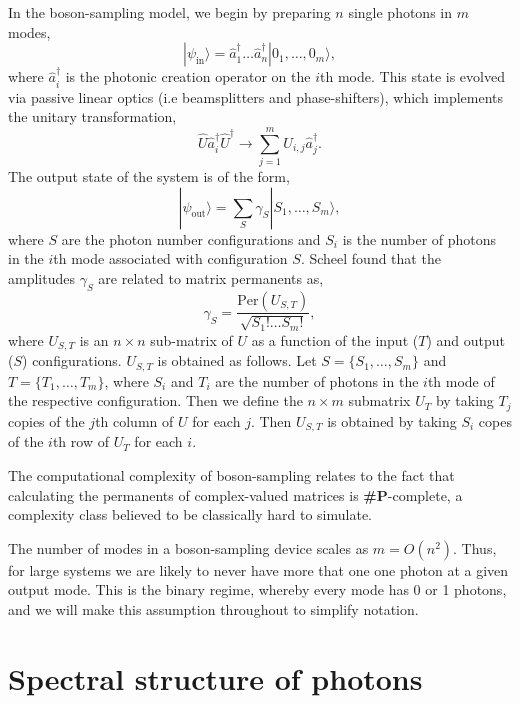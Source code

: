 \documentclass[aps,pra,twocolumn,amsmath,amssymb,nofootinbib,superscriptaddress]{revtex4}
\newcommand{\ket}[1]{|#1\rangle}
\begin{document}
In the boson-sampling model, we begin by preparing $n$ single photons in $m$ modes,
\begin{equation}
\ket{\psi_\mathrm{in}} = \hat{a}^\dag_1 \dots \hat{a}^\dag_n \ket{0_1,\dots,0_m},
\end{equation}
where \mbox{$\hat{a}^\dag_i$} is the photonic creation operator on the $i$th mode. This state is evolved via passive linear optics (i.e beamsplitters and phase-shifters), which implements the unitary transformation,
\begin{equation}
\hat{U}\hat{a}_i^\dag\hat{U}^\dag \to \sum_{j=1}^m U_{i,j} \hat{a}_j^\dag.
\end{equation}
The output state of the system is of the form,
\begin{equation}
\ket{\psi_\mathrm{out}} = \sum_S \gamma_S \ket{S_1,\dots,S_m},
\end{equation}
where $S$ are the photon number configurations and $S_i$ is the number of photons in the $i$th mode associated with configuration $S$. Scheel \cite{bib:Scheel04} found that the amplitudes $\gamma_S$ are related to matrix permanents as,
\begin{equation}
\gamma_S = \frac{\mathrm{Per}(U_{S,T})}{\sqrt{S_1!\dots S_m!}},
\end{equation}
where $U_{S,T}$ is an \mbox{$n\times n$} sub-matrix of $U$ as a function of the input ($T$) and output ($S$) configurations. $U_{S,T}$ is obtained as follows. Let \mbox{$S=\{S_1,\dots,S_m\}$} and \mbox{$T=\{T_1,\dots,T_m\}$}, where $S_i$ and $T_i$ are the number of photons in the $i$th mode of the respective configuration. Then we define the \mbox{$n\times m$} submatrix $U_T$ by taking $T_j$ copies of the $j$th column of $U$ for each $j$. Then $U_{S,T}$ is obtained by taking $S_i$ copes of the $i$th row of $U_T$ for each $i$.

The computational complexity of boson-sampling relates to the fact that calculating the permanents of complex-valued matrices is \textbf{\#P}-complete, a complexity class believed to be classically hard to simulate.

The number of modes in a boson-sampling device scales as \mbox{$m=O(n^2)$}. Thus, for large systems we are likely to never have more that one one photon at a given output mode. This is the binary regime, whereby every mode has 0 or 1 photons, and we will make this assumption throughout to simplify notation.

%
%

\section{Spectral structure of photons}
\end{document}
